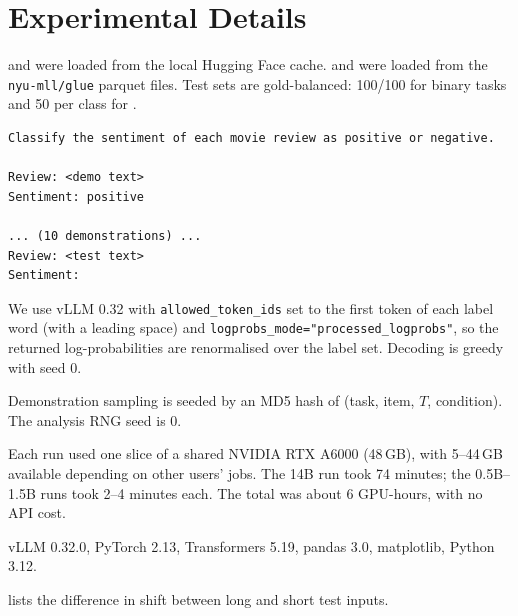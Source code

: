 \section{Experimental Details}
\label{app:details}

 \sst and \agnews were loaded from the local Hugging Face cache. \rte and \mrpc were loaded from the \texttt{nyu-mll/glue} parquet files. Test sets are gold-balanced: 100/100 for binary tasks and 50 per class for \agnews.

\begin{lstlisting}
Classify the sentiment of each movie review as positive or negative.

Review: <demo text>
Sentiment: positive

... (10 demonstrations) ...
Review: <test text>
Sentiment:
\end{lstlisting}

 We use vLLM 0.32 with \texttt{allowed\_token\_ids} set to the first token of each label word (with a leading space) and \texttt{logprobs\_mode="processed\_logprobs"}, so the returned log-probabilities are renormalised over the label set. Decoding is greedy with seed 0.

 Demonstration sampling is seeded by an MD5 hash of (task, item, $T$, condition). The analysis RNG seed is 0.

 Each run used one slice of a shared NVIDIA RTX A6000 (48\,GB), with 5--44\,GB available depending on other users' jobs. The 14B run took 74 minutes; the 0.5B--1.5B runs took 2--4 minutes each. The total was about 6 GPU-hours, with no API cost.

 vLLM 0.32.0, PyTorch 2.13, Transformers 5.19, pandas 3.0, matplotlib, Python 3.12.

  lists the difference in \lengthc shift between long and short test inputs.


